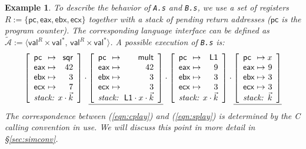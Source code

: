\documentclass[draft,11pt]{report}
\newtheorem{example}[theorem]{Example}
\theoremstyle{definition}
\newcommand{\kw}[1]{\ensuremath{ \mathsf{#1} }}
\newcommand{\figsize}{}
\begin{document}
\begin{example}
To describe the behavior of \texttt{A.s} and \texttt{B.s},
we use a set of registers
$R := \{ \kw{pc}, \kw{eax}, \kw{ebx}, \kw{ecx} \}$
together with a stack of pending return addresses
($\kw{pc}$ is the program counter).
The corresponding language interface can be defined as
$\tilde{\mathcal{A}} :=
 \langle \kw{val}^R \times \kw{val}^*, \,
         \kw{val}^R \times \kw{val}^* \rangle$.
A possible execution of \texttt{B.s}
is: %
\begin{equation} \label{eqn:splay}
{
  \figsize
  \left[
    \begin{array}{l@{{} \mapsto {}}r}
      \kw{pc}  & \kw{sqr} \\
      \kw{eax} & 42 \\
      \kw{ebx} & 3 \\
      \kw{ecx} & 7 \\
      \multicolumn{2}{c}{\textit{stack: } \hfill x \cdot \vec{k}}
    \end{array}
  \right] \cdot
  \underline{
    \left[
      \begin{array}{l@{{} \mapsto {}}r}
        \kw{pc}  & \kw{mult} \\
        \kw{eax} & 42 \\
        \kw{ebx} & 3 \\
        \kw{ecx} & 3 \\
        \multicolumn{2}{c}{\textit{stack: } \: \kw{L1} \cdot x \cdot \vec{k}}
      \end{array}
    \right]} \cdot
  \left[
    \begin{array}{l@{{} \mapsto {}}r}
      \kw{pc}  & \kw{L1} \\
      \kw{eax} & 9 \\
      \kw{ebx} & 3 \\
      \kw{ecx} & 3 \\
      \multicolumn{2}{c}{\textit{stack: } \hfill x \cdot \vec{k}}
    \end{array}
  \right] \cdot
  \underline{
    \left[
      \begin{array}{l@{{} \mapsto {}}r}
        \kw{pc}  & x \\
        \kw{eax} & 9 \\
        \kw{ebx} & 3 \\
        \kw{ecx} & 3 \\
        \multicolumn{2}{c}{\textit{stack: } \hfill \vec{k}}
      \end{array}
    \right]}
}
\end{equation}
The correspondence between (\ref{eqn:cplay}) and (\ref{eqn:splay})
is determined by the C calling convention in use.
We will discuss this point in more detail in \S\ref{sec:simconv}.
\end{example}
\end{document}
